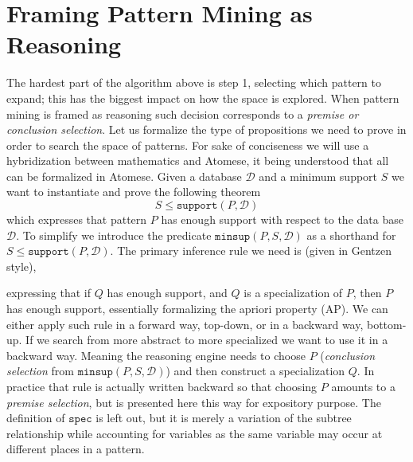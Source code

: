 \documentclass[runningheads]{llncs}
\begin{document}
\section{Framing Pattern Mining as Reasoning}
\label{FPMR}

The hardest part of the algorithm above is step 1, selecting which
pattern to expand; this has the biggest impact on how the space is
explored. When pattern mining is framed as reasoning such decision
corresponds to a \emph{premise or conclusion selection}. Let us
formalize the type of propositions we need to prove in order to search
the space of patterns. For sake of conciseness we will use a
hybridization between mathematics and Atomese, it being understood
that all can be formalized in Atomese.  Given a database $\mathcal{D}$
and a minimum support $S$ we want to instantiate and prove the
following theorem
$$ S \le \texttt{support}(P, \mathcal{D}) $$ which expresses that
pattern $P$ has enough support with respect to the data base
$\mathcal{D}$.  To simplify we introduce the predicate $
\texttt{minsup}(P, S, \mathcal{D})$ as a shorthand for $S \le
\texttt{support}(P, \mathcal{D}) $.  The primary inference rule we
need is (given in Gentzen style),
\begin{prooftree}
\end{prooftree}
expressing that if $Q$ has enough support, and $Q$ is a specialization
of $P$, then $P$ has enough support, essentially formalizing the
apriori property (AP). We can either apply such rule in a forward way,
top-down, or in a backward way, bottom-up. If we search from more
abstract to more specialized we want to use it in a backward
way. Meaning the reasoning engine needs to choose $P$
(\emph{conclusion selection} from $\texttt{minsup}(P, S,
\mathcal{D})$) and then construct a specialization $Q$.  In practice
that rule is actually written backward so that choosing $P$ amounts to
a \emph{premise selection}, but is presented here this way for
expository purpose.  The definition of $\texttt{spec}$ is left out,
but it is merely a variation of the subtree relationship while
accounting for variables as the same variable may occur at different
places in a pattern.
\end{document}
